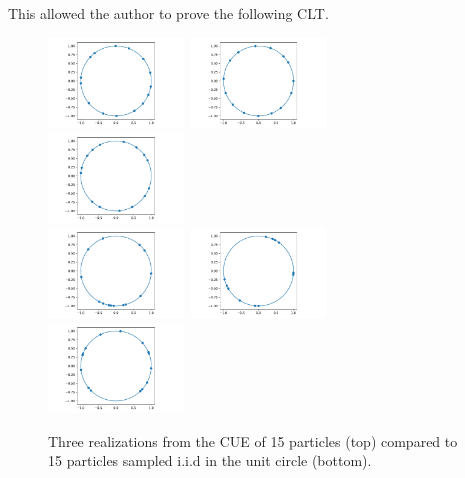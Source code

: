 \documentclass[twoside,11pt]{book}
\begin{document}
This allowed the author to prove the following CLT.



\begin{figure}
\centering
\includegraphics[width= 0.32\textwidth]{img/circle/CUE_design_N_15_fig_1.pdf}~\includegraphics[width= 0.32\textwidth]{img/circle/CUE_design_N_15_fig_2.pdf}
~\includegraphics[width= 0.32\textwidth]{img/circle/CUE_design_N_15_fig_3.pdf}\\
\includegraphics[width= 0.32\textwidth]{img/circle/iid_design_N_15_fig_1.pdf}~\includegraphics[width= 0.32\textwidth]{img/circle/iid_design_N_15_fig_2.pdf}
~\includegraphics[width= 0.32\textwidth]{img/circle/iid_design_N_15_fig_3.pdf}\\
\caption{Three realizations from the CUE of 15 particles (top) compared to 15 particles sampled i.i.d in the unit circle (bottom).}
\end{figure}
\end{document}

